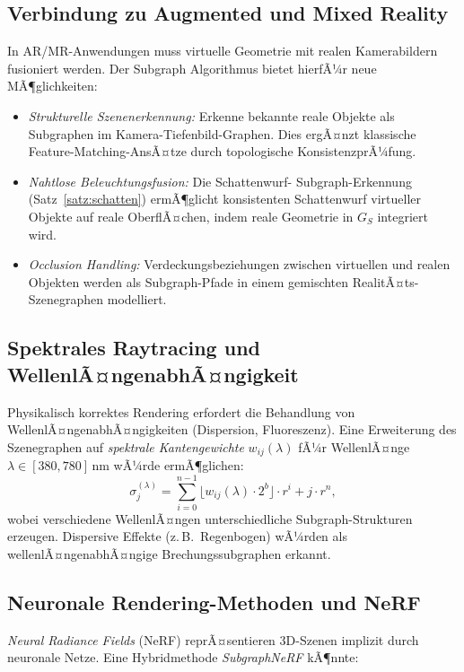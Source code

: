 ﻿\documentclass[a4paper,12pt]{article}
\theoremstyle{definition}
\begin{document}
\subsection{Verbindung zu Augmented und Mixed Reality}

In AR/MR-Anwendungen muss virtuelle Geometrie mit realen
Kamerabildern fusioniert werden. Der Subgraph Algorithmus bietet
hierfÃ¼r neue MÃ¶glichkeiten:

\begin{itemize}
  \item \emph{Strukturelle Szenenerkennung:} Erkenne bekannte reale
        Objekte als Subgraphen im Kamera-Tiefenbild-Graphen.
        Dies ergÃ¤nzt klassische Feature-Matching-AnsÃ¤tze durch
        topologische KonsistenzprÃ¼fung.
  \item \emph{Nahtlose Beleuchtungsfusion:} Die Schattenwurf-
        Subgraph-Erkennung (Satz~\ref{satz:schatten}) ermÃ¶glicht
        konsistenten Schattenwurf virtueller Objekte auf
        reale OberflÃ¤chen, indem reale Geometrie in $G_S$
        integriert wird.
  \item \emph{Occlusion Handling:} Verdeckungsbeziehungen zwischen
        virtuellen und realen Objekten werden als
        Subgraph-Pfade in einem gemischten RealitÃ¤ts-Szenegraphen
        modelliert.
\end{itemize}

\subsection{Spektrales Raytracing und WellenlÃ¤ngenabhÃ¤ngigkeit}

Physikalisch korrektes Rendering erfordert die Behandlung von
WellenlÃ¤ngenabhÃ¤ngigkeiten (Dispersion, Fluoreszenz). Eine
Erweiterung des Szenegraphen auf \emph{spektrale Kantengewichte}
$w_{ij}(\lambda)$ fÃ¼r WellenlÃ¤nge $\lambda \in [380, 780]$\,nm
wÃ¼rde ermÃ¶glichen:
\[
  \sigma_j^{(\lambda)} = \sum_{i=0}^{n-1}
  \lfloor w_{ij}(\lambda) \cdot 2^b \rfloor \cdot r^i
  + j \cdot r^n,
\]
wobei verschiedene WellenlÃ¤ngen unterschiedliche Subgraph-Strukturen
erzeugen. Dispersive Effekte (z.\,B.\ Regenbogen) wÃ¼rden als
wellenlÃ¤ngenabhÃ¤ngige Brechungssubgraphen erkannt.

\subsection{Neuronale Rendering-Methoden und NeRF}

\emph{Neural Radiance Fields} (NeRF) \citep{Mildenhall2020}
reprÃ¤sentieren 3D-Szenen implizit durch neuronale Netze.
Eine Hybridmethode \emph{SubgraphNeRF} kÃ¶nnte:
\end{document}
